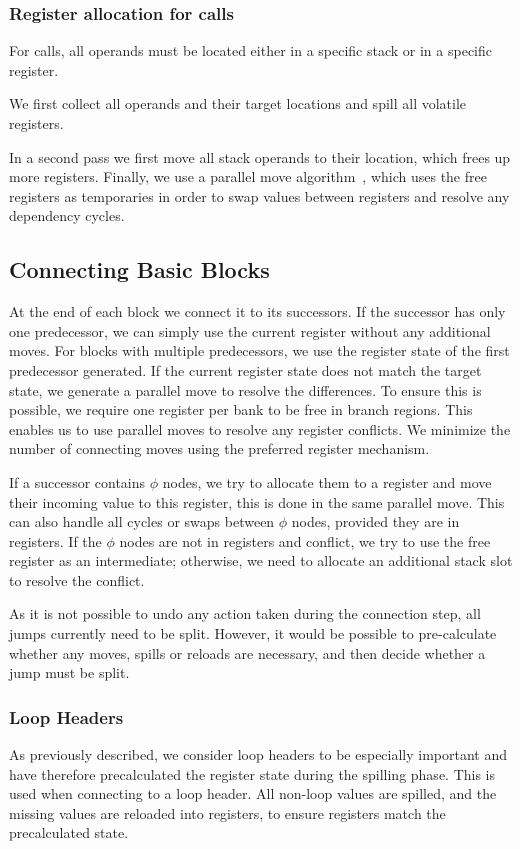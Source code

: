 \subsubsection{Register allocation for calls}
For calls, all operands must be located either in a specific stack or in a specific register.

We first collect all operands and their target locations and spill all volatile registers. 

In a second pass we first move all stack operands to their location, which frees up more registers. 
Finally, we use a parallel move algorithm~\cite{par-move}, which uses the free registers as temporaries in order to swap values between registers and resolve any dependency cycles.

\subsection{Connecting Basic Blocks}

At the end of each block we connect it to its successors. If the successor has only one predecessor, we can simply use the current register without any additional moves.   For blocks with multiple predecessors, we use the register state of the first predecessor generated.  If the current register state does not match the target state, we generate a parallel move to resolve the differences. To ensure this is possible, we require one register per bank to be free in branch regions. This enables us to use parallel moves to resolve any register conflicts. We minimize the number of connecting moves using the preferred register mechanism.

If a successor contains $\phi$ nodes, we try to allocate them to a register and move their incoming value to this register, this is done in the same parallel move. This can also handle all cycles or swaps between $\phi$ nodes, provided they are in registers. If the $\phi$ nodes are not in registers and conflict, we try to use the free register as an intermediate; otherwise, we need to allocate an additional stack slot to resolve the conflict. 

As it is not possible to undo any action taken during the connection step, all jumps currently need to be split. However, it would be possible to pre-calculate whether any moves, spills or reloads are necessary, and then decide whether a jump must be split.

\subsubsection{Loop Headers}

As previously described, we consider loop headers to be especially important and have therefore precalculated the register state during the spilling phase. This is used when connecting to a loop header. All non-loop values are spilled, and the missing values are reloaded into registers, to ensure registers match the precalculated state.